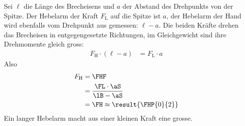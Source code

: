 Sei $\ell$ die Länge des Brecheisens und $a$ der Abstand des Drehpunkts von der Spitze. Der Hebelarm der Kraft $F_\mathrm{L}$ auf die Spitze ist $a$, der Hebelarm der Hand wird ebenfalls vom Drehpunkt aus gemessen: $\ell-a$. Die beiden Kräfte drehen das Brecheisen in entgegengesetzte Richtungen, im Gleichgewicht sind ihre Drehmomente gleich gross:
\begin{align}
 F_\mathrm{H}\cdot(\ell-a) &= F_\mathrm{L}\cdot a
\end{align}
Also
\begin{align}
 F_\mathrm{H} &= \FHF \\
   &= \frac{\FL\cdot\aS}{\lB-\aS} \\
   &= \FH \approx \result{\FHP{0}{2}}
\end{align}
Ein langer Hebelarm macht aus einer kleinen Kraft eine grosse.
